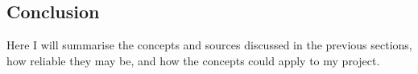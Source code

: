 		
		
		
	\subsection{Conclusion}
	\label{lr:vr:conclusion}
		Here I will summarise the concepts and sources discussed in the previous sections, how reliable they may be, and how the concepts could apply to my project.
		
		
	
